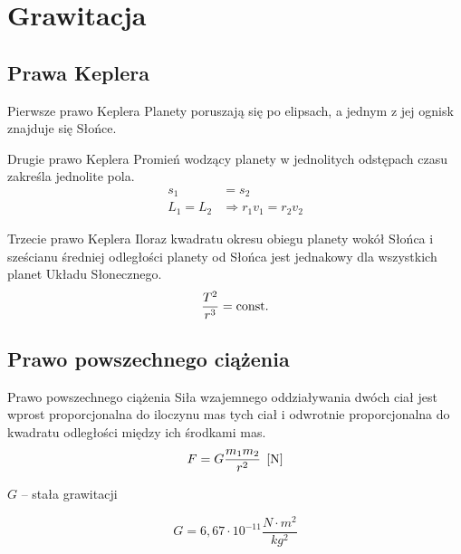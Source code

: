 \chapter{Grawitacja}

\section{Prawa Keplera}

\begin{law}{Pierwsze prawo Keplera}
  Planety poruszają się po elipsach, a jednym z jej ognisk znajduje się Słońce.
\end{law}

\begin{law}{Drugie prawo Keplera}
  Promień wodzący planety w jednolitych odstępach czasu zakreśla jednolite pola.
  \begin{align*}
    s_1 &= s_2\\
    L_1 = L_2 &\Rightarrow r_1 v_1 = r_2 v_2
  \end{align*}
\end{law}

\begin{law}{Trzecie prawo Keplera}
  Iloraz kwadratu okresu obiegu planety wokół Słońca i sześcianu średniej odległości planety od
  Słońca jest jednakowy dla wszystkich planet Układu Słonecznego.
  \begin{equation*}
    \frac{T^2}{r^3} = \operatorname{const.}
  \end{equation*}
\end{law}

\section{Prawo powszechnego ciążenia}
\begin{law}{Prawo powszechnego ciążenia}
  Siła wzajemnego oddziaływania dwóch ciał jest wprost proporcjonalna do iloczynu mas tych ciał i
  odwrotnie proporcjonalna do kwadratu odległości między ich środkami mas.
  \begin{equation}
    F = G\frac{m_1 m_2}{r^2} \;\left[\mathrm{N}\right]
  \end{equation}
  \begin{symbols}
    \item $G$ -- stała grawitacji
  \end{symbols}
  \begin{equation*}
    G = 6,67\cdot 10^{-11} \unit{\frac{N \cdot m^2}{kg^2}}
  \end{equation*}
\end{law}

